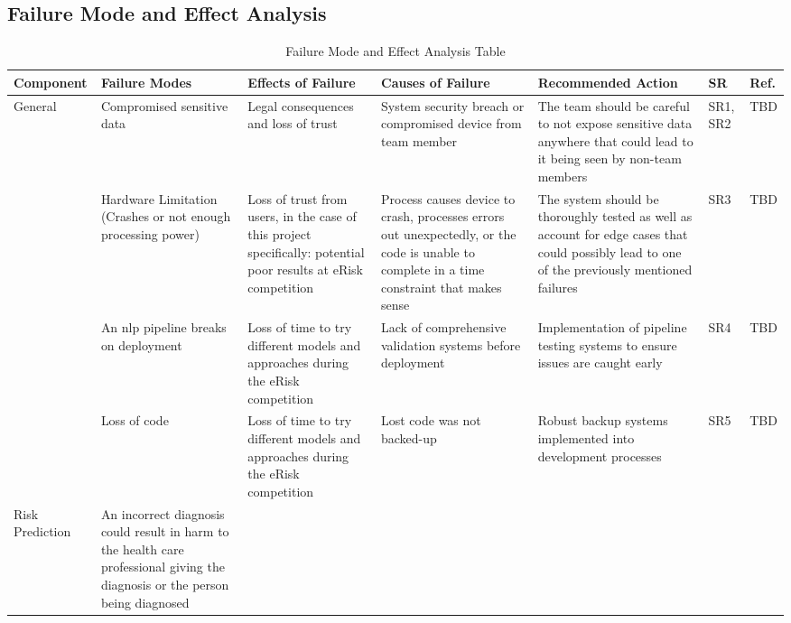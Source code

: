 \documentclass{article}
\begin{document}
\begin{landscape}
    \section{Failure Mode and Effect Analysis}
    \begin{longtable}{|p{}|p{}|p{}|p{}|p{}|p{}|p{}|}
        \caption{Failure Mode and Effect Analysis Table} \\
        \hline
        \textbf{Component} & \textbf{Failure Modes} & \textbf{Effects of Failure} & \textbf{Causes of Failure} & \textbf{Recommended Action} & \textbf{SR} & \textbf{Ref.} \\
        \hline
        \multirow{4}{*}{General} 
        & Compromised sensitive data
        & Legal consequences and loss of trust 
        & System security breach or compromised device from team member 
        & The team should be careful to not expose sensitive data anywhere that could lead to it being seen by non-team members 
        & SR1, SR2
        & TBD \\
        \cline{2-7}
        & Hardware Limitation (Crashes or not enough processing power)
        & Loss of trust from users, in the case of this project specifically: potential poor results at eRisk competition
        & Process causes device to crash, processes errors out unexpectedly, or the code is unable to complete in a time constraint that makes sense 
        & The system should be thoroughly tested as well as account for edge cases that could possibly lead to one of the previously mentioned failures  
        & SR3 
        & TBD \\
        \cline{2-7}
        & An nlp pipeline breaks on deployment
        & Loss of time to try different models and approaches during the eRisk competition
        & Lack of comprehensive validation systems before deployment
        & Implementation of pipeline testing systems to ensure issues are caught early
        & SR4
        & TBD \\
        \cline{2-7}
        & Loss of code
        & Loss of time to try different models and approaches during the eRisk competition
        & Lost code was not backed-up
        & Robust backup systems implemented into development processes
        & SR5
        & TBD \\
        \hline
        \multirow{2}{*}{Risk Prediction} 
        & An incorrect diagnosis could result in harm to the health care professional giving the diagnosis or the person being diagnosed

\end{longtable}
\end{landscape}
\end{document}
